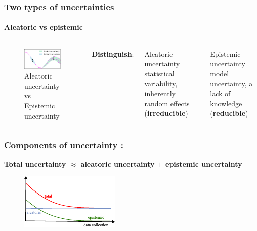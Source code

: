 \begin{frame}
\frametitle{Two types of uncertainties}
\framesubtitle{Aleatoric vs epistemic}

\begin{columns}
        \begin{figure}
        \centering
            \includegraphics[width = 9cm]{figures/aleatoricvsepisidemic.pdf}
            \caption*{Aleatoric uncertainty vs Epistemic uncertainty}
        \end{figure} 
     \textbf{Distinguish}:
     \begin{block}{Aleatoric uncertainty}
statistical variability, inherently random effects (\textbf{irreducible})
     \end{block}
     \begin{block}{Epistemic uncertainty}
model uncertainty, a lack of knowledge (\textbf{reducible})
     \end{block}    
    \end{columns}
\end{frame}
\begin{frame}
\frametitle{Components of uncertainty :}
\Large\textbf{Total uncertainty $\approx$ aleatoric uncertainty $+$ epistemic uncertainty}
\begin{figure}
\includegraphics[scale=2.5]{figures/figure-total_Uncertainty.pdf}
\end{figure}

\end{frame}
